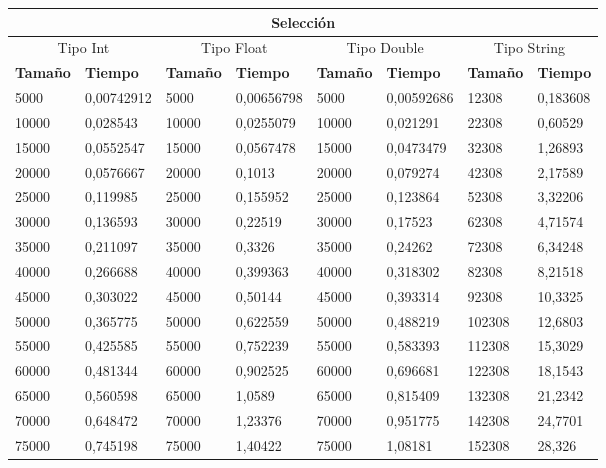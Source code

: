 \documentclass[11pt]{article}
\begin{document}
\begin{table}[!ht]
    \centering
    \small
    \begin{tabular}{|l|l|l|l|l|l|l|l|}
    \hline
    \multicolumn{8}{|c|}{\cellcolor{blue!20}\textbf{Selección}} \\ \hline
    \multicolumn{2}{|c|}{\cellcolor{gray!20}Tipo Int} & \multicolumn{2}{c|}{\cellcolor{gray!20}Tipo Float} & \multicolumn{2}{c|}{\cellcolor{gray!20}Tipo Double} & \multicolumn{2}{c|}{\cellcolor{gray!20}Tipo String}\\ \hline
        \textbf{Tamaño} & \textbf{Tiempo} & \textbf{Tamaño} & \textbf{Tiempo} & \textbf{Tamaño} & \textbf{Tiempo} & \textbf{Tamaño} & \textbf{Tiempo} \\ \hline
        5000 & 0,00742912 & 5000 & 0,00656798 & 5000 & 0,00592686 & 12308 & 0,183608 \\ \hline
        10000 & 0,028543 & 10000 & 0,0255079 & 10000 & 0,021291 & 22308 & 0,60529 \\ \hline
        15000 & 0,0552547 & 15000 & 0,0567478 & 15000 & 0,0473479 & 32308 & 1,26893 \\ \hline
        20000 & 0,0576667 & 20000 & 0,1013 & 20000 & 0,079274 & 42308 & 2,17589 \\ \hline
        25000 & 0,119985 & 25000 & 0,155952 & 25000 & 0,123864 & 52308 & 3,32206 \\ \hline
        30000 & 0,136593 & 30000 & 0,22519 & 30000 & 0,17523 & 62308 & 4,71574 \\ \hline
        35000 & 0,211097 & 35000 & 0,3326 & 35000 & 0,24262 & 72308 & 6,34248 \\ \hline
        40000 & 0,266688 & 40000 & 0,399363 & 40000 & 0,318302 & 82308 & 8,21518 \\ \hline
        45000 & 0,303022 & 45000 & 0,50144 & 45000 & 0,393314 & 92308 & 10,3325 \\ \hline
        50000 & 0,365775 & 50000 & 0,622559 & 50000 & 0,488219 & 102308 & 12,6803 \\ \hline
        55000 & 0,425585 & 55000 & 0,752239 & 55000 & 0,583393 & 112308 & 15,3029 \\ \hline
        60000 & 0,481344 & 60000 & 0,902525 & 60000 & 0,696681 & 122308 & 18,1543 \\ \hline
        65000 & 0,560598 & 65000 & 1,0589 & 65000 & 0,815409 & 132308 & 21,2342 \\ \hline
        70000 & 0,648472 & 70000 & 1,23376 & 70000 & 0,951775 & 142308 & 24,7701 \\ \hline
        75000 & 0,745198 & 75000 & 1,40422 & 75000 & 1,08181 & 152308 & 28,326 \\ \hline

\end{tabular}
\end{table}
\end{document}
